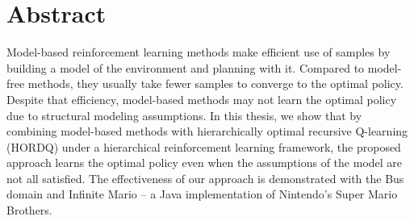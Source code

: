 






\chapter{Abstract}

Model-based reinforcement learning methods make efficient use of samples by
building a model of the environment and planning with it. Compared to
model-free methods, they usually take fewer samples to converge to the optimal
policy. Despite that efficiency, model-based methods may not learn the optimal
policy due to structural modeling assumptions. In this thesis, we show that by
combining model-based methods with hierarchically optimal recursive Q-learning (HORDQ)
under a hierarchical reinforcement learning framework, the proposed approach
learns the optimal policy even when the assumptions of the model are not all
satisfied. The effectiveness of our approach is demonstrated with the Bus domain
and Infinite Mario -- a Java implementation of Nintendo's Super Mario Brothers.


